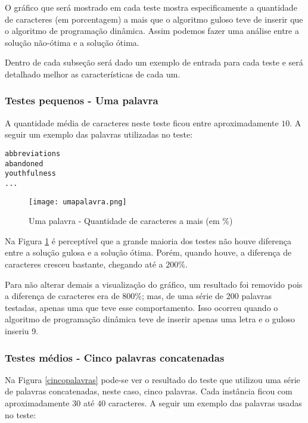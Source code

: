 \documentclass[12pt]{article}
\begin{document}
O gráfico que será mostrado em cada teste mostra especificamente a quantidade de caracteres (em porcentagem) a mais que o algoritmo guloso teve de inserir que o algoritmo de programação dinâmica. Assim podemos fazer uma análise entre a solução não-ótima e a solução ótima.

Dentro de cada subseção será dado um exemplo de entrada para cada teste e será detalhado melhor as características de cada um.

\subsubsection{Testes pequenos - Uma palavra}
\label{pequeno}

A quantidade média de caracteres neste teste ficou entre aproximadamente $10$. A seguir um exemplo das palavras utilizadas no teste:

\begin{verbatim}
abbreviations
abandoned
youthfulness
...
\end{verbatim}


    \begin{figure}[h!]
        \centering
        \texttt{[image: umapalavra.png]}
        \caption{Uma palavra - Quantidade de caracteres a mais (em \%)}
        \label{umapalavra}
    \end{figure}

    Na Figura \ref{umapalavra} é perceptível que a grande maioria dos testes não houve diferença entre a solução gulosa e a solução ótima. Porém, quando houve, a diferença de caracteres cresceu bastante, chegando até a $200\%$.

    Para não alterar demais a visualização do gráfico, um resultado foi removido pois a diferença de caracteres era de $800\%$; mas, de uma série de 200 palavras testadas, apenas uma que teve esse comportamento. Isso ocorreu quando o algoritmo de programação dinâmica teve de inserir apenas uma letra e o guloso inseriu 9.


\subsubsection{Testes médios - Cinco palavras concatenadas}
\label{medio}

Na Figura \ref{cincopalavras} pode-se ver o resultado do teste que utilizou uma série de palavras concatenadas, neste caso, cinco palavras. Cada instância ficou com aproximadamente $30$ até $40$ caracteres. A seguir um exemplo das palavras usadas no teste:
\end{document}
